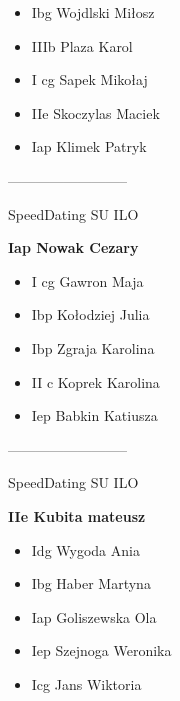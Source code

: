 \documentclass[a4paper,10pt]{article}
\begin{document}
\begin{multicols}{3}
\begin{minipage}[l]{\textwidth}
  \begin{itemize}
    \item Ibg Wojdlski Miłosz
    \item IIIb Plaza Karol
    \item I cg Sapek Mikołaj
    \item IIe Skoczylas Maciek
    \item Iap Klimek Patryk

    \end{itemize}



\end{minipage}



\begin{minipage}[l]{\textwidth}
--------------------------

  \footnotesize{SpeedDating SU ILO}

  \bfseries{Iap Nowak Cezary}

  \begin{itemize}
    \item I cg Gawron Maja
    \item Ibp Kołodziej Julia
    \item Ibp Zgraja Karolina
    \item II c Koprek Karolina
    \item Iep Babkin Katiusza

    \end{itemize}



\end{minipage}



\begin{minipage}[l]{\textwidth}
--------------------------

  \footnotesize{SpeedDating SU ILO}

  \bfseries{IIe Kubita mateusz}

  \begin{itemize}
    \item Idg Wygoda Ania
    \item Ibg Haber Martyna
    \item Iap Goliszewska Ola
    \item Iep Szejnoga Weronika
    \item Icg Jans Wiktoria

    \end{itemize}




\end{minipage}
\end{multicols}
\end{document}
